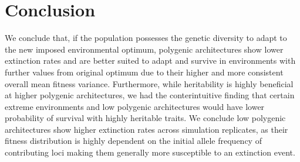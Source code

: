 \documentclass{article}
\begin{document}
\section{Conclusion}
We conclude that, if the population possesses the genetic diversity to adapt to the new imposed environmental optimum, polygenic architectures show lower extinction rates and are better suited to adapt and survive in environments with further values from original optimum due to their higher and more consistent overall mean fitness variance. Furthermore, while heritability is highly beneficial at higher polygenic architectures, we had the conterintuitive finding that certain extreme environments and low polygenic architectures would have lower probability of survival with highly heritable traits. We conclude low polygenic architectures show higher extinction rates across simulation replicates, as their fitness distribution is highly dependent on the initial allele frequency of contributing loci making them generally more susceptible to an extinction event. 


\end{document}
